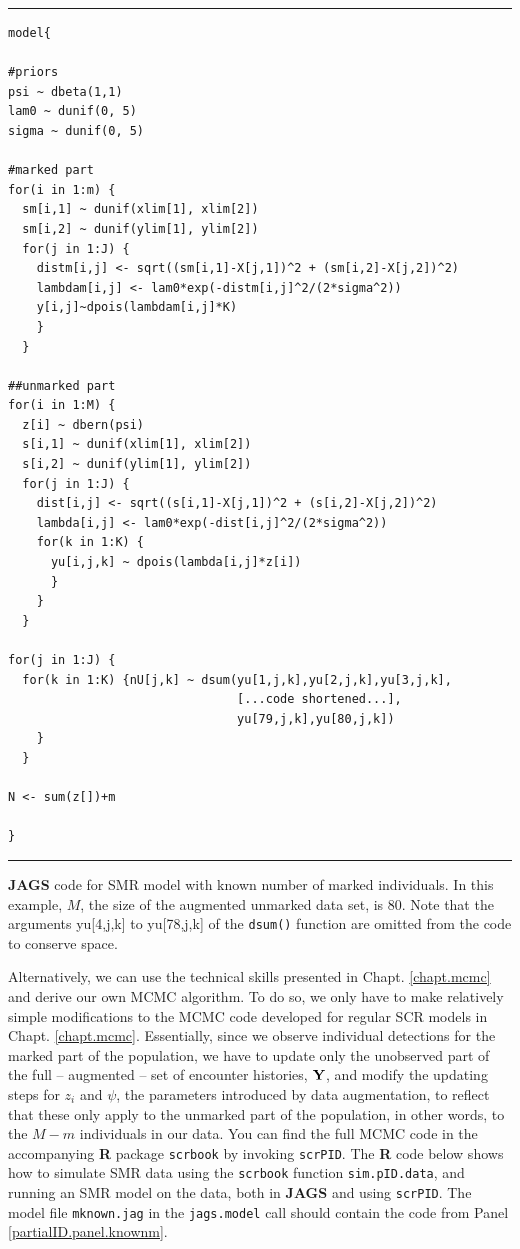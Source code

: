 \begin{panel}[htp]
\centering
\rule[0.15in]{\textwidth}{.03in}
{\small
\begin{verbatim}
model{

#priors
psi ~ dbeta(1,1)
lam0 ~ dunif(0, 5)
sigma ~ dunif(0, 5)

#marked part
for(i in 1:m) {
  sm[i,1] ~ dunif(xlim[1], xlim[2])
  sm[i,2] ~ dunif(ylim[1], ylim[2])
  for(j in 1:J) {
    distm[i,j] <- sqrt((sm[i,1]-X[j,1])^2 + (sm[i,2]-X[j,2])^2)
    lambdam[i,j] <- lam0*exp(-distm[i,j]^2/(2*sigma^2))
    y[i,j]~dpois(lambdam[i,j]*K)
    }
  }

##unmarked part
for(i in 1:M) {
  z[i] ~ dbern(psi)
  s[i,1] ~ dunif(xlim[1], xlim[2])
  s[i,2] ~ dunif(ylim[1], ylim[2])
  for(j in 1:J) {
    dist[i,j] <- sqrt((s[i,1]-X[j,1])^2 + (s[i,2]-X[j,2])^2)
    lambda[i,j] <- lam0*exp(-dist[i,j]^2/(2*sigma^2))
    for(k in 1:K) {
      yu[i,j,k] ~ dpois(lambda[i,j]*z[i])
      }
    }
  }

for(j in 1:J) {
  for(k in 1:K) {nU[j,k] ~ dsum(yu[1,j,k],yu[2,j,k],yu[3,j,k],
								[...code shortened...],
								yu[79,j,k],yu[80,j,k])
	}
  }

N <- sum(z[])+m

}
\end{verbatim}
}
\rule[-0.15in]{\textwidth}{.03in}
\caption{
{\bf JAGS} code for SMR model with known number of marked
individuals. In this example, $M$, the size of the augmented unmarked
data set, is 80. Note that the arguments yu[4,j,k] to yu[78,j,k] of
the {\tt dsum()} function are omitted from the code to conserve
space. 
}
\label{partialID.panel.knownm}
\end{panel}

Alternatively, we can use the technical skills presented in Chapt. \ref{chapt.mcmc} and derive our own MCMC algorithm. To do so, we only have to make relatively
simple modifications to the MCMC code developed for regular SCR models in
Chapt. \ref{chapt.mcmc}.
Essentially, since we observe individual detections for the marked part of the population, we have to update only the unobserved part of the full -- augmented -- set of encounter histories, ${\bf Y}$, and
modify the updating steps for $z_i$ and $\psi$, the parameters introduced by data augmentation, to reflect that these only apply to the unmarked part of the population, in other words, to the $M-m$ individuals in our data. You can find the full MCMC code in the accompanying {\bf R} package {\tt scrbook} by invoking {\tt scrPID}. The {\bf R} code below shows how to simulate SMR data using the {\tt scrbook} function {\tt sim.pID.data}, and running an SMR model on the data, both in {\bf JAGS} and using {\tt scrPID}. The model file {\tt mknown.jag} in the {\tt jags.model} call should contain the code from Panel \ref{partialID.panel.knownm}.

